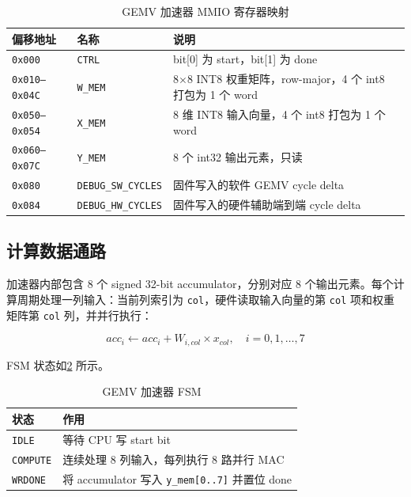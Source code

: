 \documentclass[12pt, a4paper]{article}
\begin{document}
\begin{table}[H]
    \centering
    \caption{GEMV 加速器 MMIO 寄存器映射}
    \label{tab:regmap}
    \begin{tabular}{p{3.0cm}p{4.0cm}p{6.6cm}}
        \toprule
        \textbf{偏移地址} & \textbf{名称} & \textbf{说明} \\
        \midrule
        \texttt{0x000} & \texttt{CTRL} & bit[0] 为 start，bit[1] 为 done \\
        \texttt{0x010--0x04C} & \texttt{W\_MEM} & 8$\times$8 INT8 权重矩阵，row-major，4 个 int8 打包为 1 个 word \\
        \texttt{0x050--0x054} & \texttt{X\_MEM} & 8 维 INT8 输入向量，4 个 int8 打包为 1 个 word \\
        \texttt{0x060--0x07C} & \texttt{Y\_MEM} & 8 个 int32 输出元素，只读 \\
        \texttt{0x080} & \texttt{DEBUG\_SW\_CYCLES} & 固件写入的软件 GEMV cycle delta \\
        \texttt{0x084} & \texttt{DEBUG\_HW\_CYCLES} & 固件写入的硬件辅助端到端 cycle delta \\
        \bottomrule
    \end{tabular}
\end{table}

\subsection{计算数据通路}

加速器内部包含 8 个 signed 32-bit accumulator，分别对应 8 个输出元素。每个计算周期处理一列输入：当前列索引为 \texttt{col}，硬件读取输入向量的第 \texttt{col} 项和权重矩阵第 \texttt{col} 列，并并行执行：

\begin{equation}
    acc_i \leftarrow acc_i + W_{i,col} \times x_{col},\quad i=0,1,\dots,7
\end{equation}

FSM 状态如\cref{tab:fsm} 所示。

\begin{table}[H]
    \centering
    \caption{GEMV 加速器 FSM}
    \label{tab:fsm}
    \begin{tabular}{ll}
        \toprule
        \textbf{状态} & \textbf{作用} \\
        \midrule
        \texttt{IDLE} & 等待 CPU 写 start bit \\
        \texttt{COMPUTE} & 连续处理 8 列输入，每列执行 8 路并行 MAC \\
        \texttt{WRDONE} & 将 accumulator 写入 \texttt{y\_mem[0..7]} 并置位 done \\
        \bottomrule
    \end{tabular}
\end{table}
\end{document}
